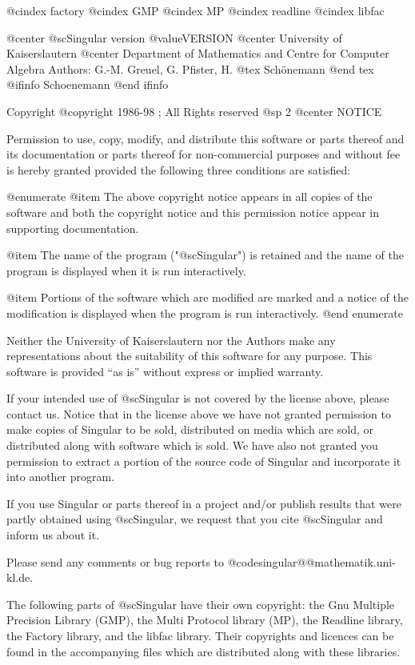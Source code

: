 @cindex factory
@cindex GMP
@cindex MP
@cindex readline
@cindex libfac

@center @sc{Singular} version @value{VERSION}
@center University of Kaiserslautern
@center Department of Mathematics and Centre for Computer Algebra
Authors: G.-M. Greuel, G. Pfister, H.
@tex
 Sch\"onemann
@end tex
@ifinfo
 Schoenemann
@end ifinfo

Copyright @copyright{} 1986-98 ; All Rights reserved
@sp 2
                                @center NOTICE


Permission to use, copy, modify, and distribute this software or parts
thereof and its documentation or parts thereof for non-commercial
purposes and without fee is hereby granted provided the following three
conditions are satisfied:

@enumerate
@item
The above copyright notice appears in all copies of the software
and both the copyright notice and this permission notice
appear in supporting documentation.

@item
The name of the program ("@sc{Singular}") is retained and the name of
the program is displayed when it is run interactively.

@item
Portions of the software which are modified are marked and a notice of the
modification is displayed when the program is run interactively.
@end enumerate

Neither the University of Kaiserslautern nor the Authors make any
representations about the suitability of this software for any
purpose.  This software is provided ``as is'' without express or
implied warranty.

If your intended use of @sc{Singular} is not covered by the license above,
please contact us.  Notice that in the license above we have not
granted permission to make copies of Singular to be sold, distributed
on media which are sold, or distributed along with software which is
sold. We have also not granted you permission to extract a portion
of the source code of Singular and incorporate it into another program.

If you use Singular or parts thereof in a project and/or publish
results that were partly obtained using @sc{Singular}, we request that you
cite @sc{Singular} and inform us about it.

Please send any comments or bug reports to
@code{singular@@mathematik.uni-kl.de}.

The following parts of @sc{Singular} have their own copyright: the Gnu Multiple
Precision Library (GMP), the Multi Protocol library (MP), the Readline library,
the Factory library, and the libfac library.
Their copyrights and licences can be found in the accompanying files
which are distributed along with these libraries.

